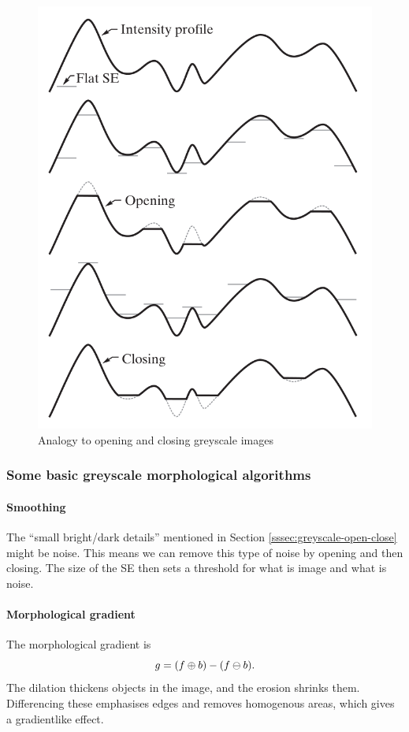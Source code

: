 \begin{figure}[htbp]
    \centering
    \includegraphics[width=0.8\linewidth]{images/greyscale-opening-closing}
    \caption{Analogy to opening and closing greyscale images}
    \label{fig:greyscale-opening-closing}
\end{figure}

\subsubsection{Some basic greyscale morphological algorithms}

\paragraph{Smoothing}
The ``small bright/dark details'' mentioned in Section \ref{sssec:greyscale-open-close} might be noise. This means we can remove this type of noise by opening and then closing. The size of the SE then sets a threshold for what is image and what is noise.

\paragraph{Morphological gradient}
The morphological gradient is
\begin{equation}
    g = (f \oplus b) - (f \ominus b).
\end{equation}
The dilation thickens objects in the image, and the erosion shrinks them. Differencing these emphasises edges and removes homogenous areas, which gives a gradientlike effect.

